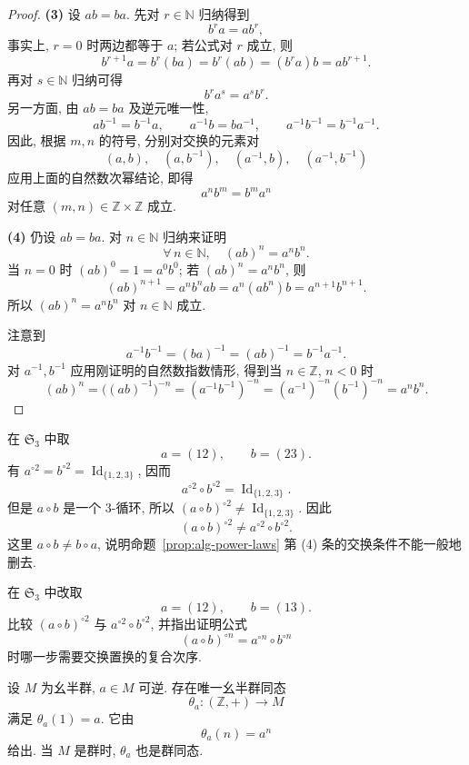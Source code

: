 \documentclass[usesamecnt, thmcnt=section, lang=cn, newtx, 10pt, scheme=chinese]{elegantbook}
\begin{document}
\begin{proof}
\smallskip
\noindent
\textbf{(3)} 设 $ab=ba$. 先对 $r\in\mathbb N$ 归纳得到
\[
 b^ra=ab^r,
\]
事实上, $r=0$ 时两边都等于 $a$; 若公式对 $r$ 成立, 则
\[
 b^{r+1}a=b^r(ba)=b^r(ab)=(b^ra)b=ab^{r+1}.
\]
再对 $s\in\mathbb N$ 归纳可得
\[
 b^ra^s=a^sb^r.
\]
另一方面, 由 $ab=ba$ 及逆元唯一性,
\[
 ab^{-1}=b^{-1}a,
 \qquad
 a^{-1}b=ba^{-1},
 \qquad
 a^{-1}b^{-1}=b^{-1}a^{-1}.
\]
因此, 根据 $m,n$ 的符号, 分别对交换的元素对
\[
 (a,b),\quad(a,b^{-1}),\quad(a^{-1},b),\quad(a^{-1},b^{-1})
\]
应用上面的自然数次幂结论, 即得
\[
 a^nb^m=b^ma^n
\]
对任意 $(m,n)\in\mathbb Z\times\mathbb Z$ 成立.

\smallskip
\noindent
\textbf{(4)} 仍设 $ab=ba$. 对 $n\in\mathbb N$ 归纳来证明
\[\forall\,n\in\mathbb N,\quad (ab)^n=a^nb^n.\] 当 $n=0$ 时 $(ab)^0=1=a^0b^0$; 若 $(ab)^n=a^nb^n$, 则
\[
 (ab)^{n+1}
 =a^nb^nab
 =a^n(ab^n)b
 =a^{n+1}b^{n+1}.
\]
所以 $(ab)^n=a^nb^n$ 对 $n\in\mathbb N$ 成立.

注意到 
\[a^{-1}b^{-1}=(ba)^{-1}=(ab)^{-1}=b^{-1}a^{-1}.\]
对 $a^{-1},b^{-1}$ 应用刚证明的自然数指数情形, 得到当 $n\in\mathbb Z$, $n<0$ 时
\[
 (ab)^n
 =\bigl((ab)^{-1}\bigr)^{-n}
 =(a^{-1}b^{-1})^{-n}
 =(a^{-1})^{-n}(b^{-1})^{-n}
 =a^nb^n.
\]
\end{proof}

\begin{instance}
在 $\mathfrak S_3$ 中取
\[
 a=(12),\qquad b=(23).
\]
有 $a^{\circ 2}=b^{\circ 2}=\operatorname{Id}_{\{1,2,3\}}$, 因而
\[
 a^{\circ 2}\circ b^{\circ 2}=\operatorname{Id}_{\{1,2,3\}}.
\]
但是 $a\circ b$ 是一个 $3$-循环, 所以 $(a\circ b)^{\circ 2}\neq\operatorname{Id}_{\{1,2,3\}}$. 因此
\[
 (a\circ b)^{\circ 2}\neq a^{\circ 2}\circ b^{\circ 2}.
\]
这里 $a\circ b\neq b\circ a$, 说明命题~\ref{prop:alg-power-laws} 第 (4) 条的交换条件不能一般地删去.
\end{instance}

\begin{exercise}\label{ex:alg-power-commute}
在 $\mathfrak S_3$ 中改取
\[
 a=(12),\qquad b=(13).
\]
比较 $(a\circ b)^{\circ 2}$ 与 $a^{\circ 2}\circ b^{\circ 2}$, 并指出证明公式
\[
 (a\circ b)^{\circ n}=a^{\circ n}\circ b^{\circ n}
\]
时哪一步需要交换置换的复合次序.
\end{exercise}

\begin{proposition}\label{prop:alg-Z-universal-group}
设 $M$ 为幺半群, $a\in M$ 可逆. 存在唯一幺半群同态
\[
 \theta_a:(\mathbb Z,+)\longrightarrow M
\]
满足 $\theta_a(1)=a$. 它由
\[
 \theta_a(n)=a^n
\]
给出. 当 $M$ 是群时, $\theta_a$ 也是群同态.
\end{proposition}
\end{document}

